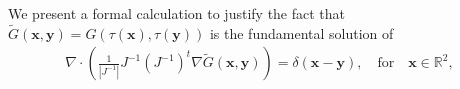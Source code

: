 \documentclass[11pt]{article}
\newcommand{\R}{\mathbb{R}}
\newcommand{\bx}{\mathbf{x}}
\newcommand{\by}{\mathbf{y}}
\begin{document}
We present a formal calculation to justify the fact that $\tilde{G}(\bx,\by) =G(\tau(\bx),\tau(\by))$ is the fundamental solution of
\begin{align}
  \nabla \cdot \left( \frac{1}{|J^{-1}|}J^{-1}(J^{-1})^t \nabla \tilde{G}(\bx,\by) \right) = \delta(\bx - \by),
  \quad \mbox{for} \quad \bx \in \R^2,
\end{align}


\end{document}
